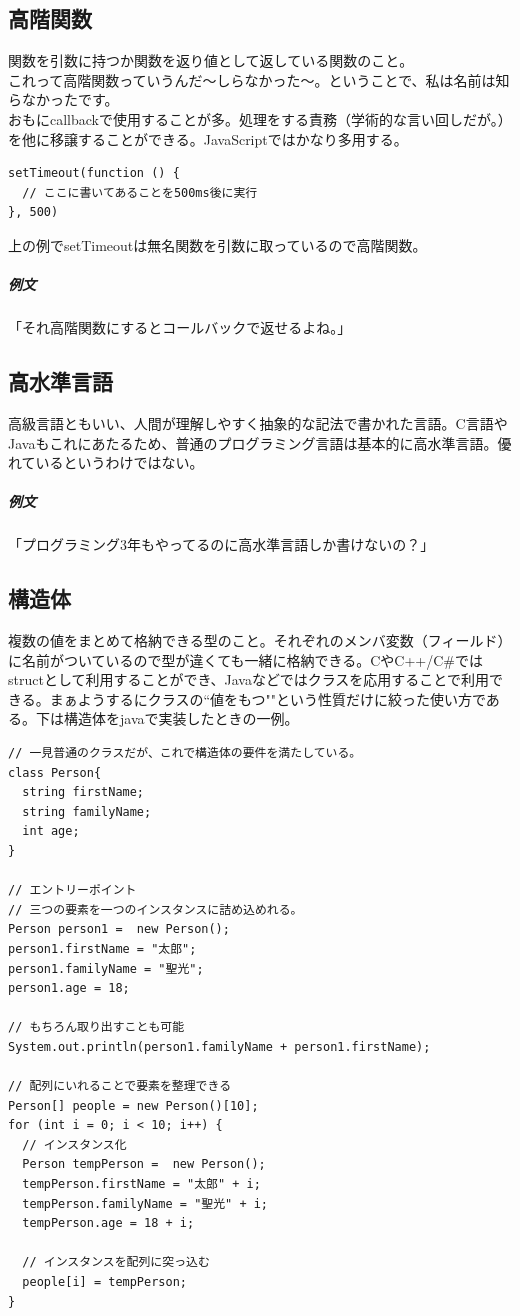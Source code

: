 \documentclass[dvipdfmx,jb5]{jreport}
\begin{document}
\subsection{高階関数}
関数を引数に持つか関数を返り値として返している関数のこと。
\\

これって高階関数っていうんだ〜しらなかった〜。ということで、私は名前は知らなかったです。
\\

おもにcallbackで使用することが多。処理をする責務（学術的な言い回しだが。）を他に移譲することができる。JavaScriptではかなり多用する。

\lstset{language=JavaScript}
\begin{lstlisting}
setTimeout(function () {
  // ここに書いてあることを500ms後に実行
}, 500)
\end{lstlisting}

上の例でsetTimeoutは無名関数を引数に取っているので高階関数。
\subparagraph{例文} 「それ高階関数にするとコールバックで返せるよね。」

\subsection{高水準言語}
高級言語ともいい、人間が理解しやすく抽象的な記法で書かれた言語。C言語やJavaもこれにあたるため、普通のプログラミング言語は基本的に高水準言語。優れているというわけではない。

\subparagraph{例文} 「プログラミング3年もやってるのに高水準言語しか書けないの？」

\subsection{構造体}
複数の値をまとめて格納できる型のこと。それぞれのメンバ変数（フィールド）に名前がついているので型が違くても一緒に格納できる。CやC++/C\#ではstructとして利用することができ、Javaなどではクラスを応用することで利用できる。まぁようするにクラスの``値をもつ""という性質だけに絞った使い方である。下は構造体をjavaで実装したときの一例。

\lstset{language=Java}
\begin{lstlisting}
// 一見普通のクラスだが、これで構造体の要件を満たしている。
class Person{
  string firstName;
  string familyName;
  int age;
}

// エントリーポイント
// 三つの要素を一つのインスタンスに詰め込めれる。
Person person1 =  new Person();
person1.firstName = "太郎";
person1.familyName = "聖光";
person1.age = 18;

// もちろん取り出すことも可能
System.out.println(person1.familyName + person1.firstName);

// 配列にいれることで要素を整理できる
Person[] people = new Person()[10];
for (int i = 0; i < 10; i++) {
  // インスタンス化
  Person tempPerson =  new Person();
  tempPerson.firstName = "太郎" + i;
  tempPerson.familyName = "聖光" + i;
  tempPerson.age = 18 + i;

  // インスタンスを配列に突っ込む
  people[i] = tempPerson;
}
\end{lstlisting}
\end{document}
